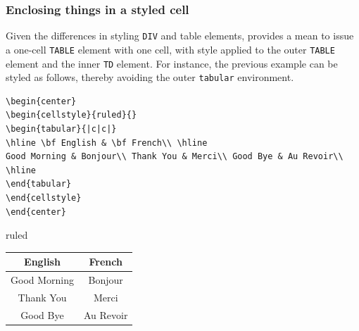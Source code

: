 \subsubsection{Enclosing things in a styled cell}%
%
%
Given the differences in styling \verb+DIV+ and table elements, \hevea{}
provides a mean to issue a one-cell \verb+TABLE+ element with one cell,
with style applied to the outer \verb+TABLE+ element and the inner
\verb+TD+ element.
For instance, the previous example can be styled as follows, thereby
avoiding the outer \texttt{tabular} environment.
\begin{verbatim}
\begin{center}
\begin{cellstyle}{ruled}{}
\begin{tabular}{|c|c|}
\hline \bf English & \bf French\\ \hline
Good Morning & Bonjour\\ Thank You & Merci\\ Good Bye & Au Revoir\\
\hline
\end{tabular}
\end{cellstyle}
\end{center}
\end{verbatim}
\begin{htmlonly}
\begin{center}
\begin{cellstyle}{ruled}{}
\begin{tabular}{|c|c|}
\hline \bf English & \bf French\\ \hline
Good Morning & Bonjour\\ Thank You & Merci\\ Good Bye & Au Revoir\\
\hline
\end{tabular}
\end{cellstyle}
\end{center}
\end{htmlonly}
\begin{latexonly}
\begin{center}\end{center}
\end{latexonly}





